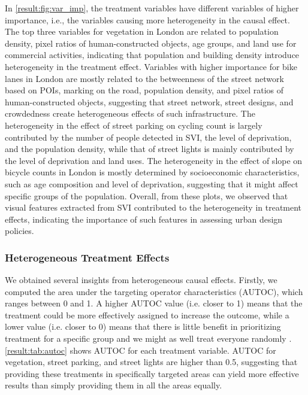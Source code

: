 \documentclass[preprint,12pt, authoryear]{elsarticle}
\begin{document}
In \autoref{result:fig:var_imp}, the treatment variables have different variables of higher importance, i.e., the variables causing more heterogeneity in the causal effect. 
The top three variables for vegetation in London are related to population density, pixel ratios of human-constructed objects, age groups, and land use for commercial activities, indicating that population and building density introduce heterogeneity in the treatment effect.
Variables with higher importance for bike lanes in London are mostly related to the betweenness of the street network based on POIs, marking on the road, population density, and pixel ratios of human-constructed objects, suggesting that street network, street designs, and crowdedness create heterogeneous effects of such infrastructure.
The heterogeneity in the effect of street parking on cycling count is largely contributed by the number of people detected in SVI, the level of deprivation, and the population density, while that of street lights is mainly contributed by the level of deprivation and land uses.
The heterogeneity in the effect of slope on bicycle counts in London is mostly determined by socioeconomic characteristics, such as age composition and level of deprivation, suggesting that it might affect specific groups of the population.
Overall, from these plots, we observed that visual features extracted from SVI contributed to the heterogeneity in treatment effects, indicating the importance of such features in assessing urban design policies.

\subsubsection{Heterogeneous Treatment Effects}
We obtained several insights from heterogeneous causal effects. 
Firstly, we computed the area under the targeting operator characteristics (AUTOC), which ranges between 0 and 1. A higher AUTOC value (i.e. closer to 1) means that the treatment could be more effectively assigned to increase the outcome, while a lower value (i.e. closer to 0) means that there is little benefit in prioritizing treatment for a specific group and we might as well treat everyone randomly \citep{yadlowsky_evaluating_2021}. 
\autoref{result:tab:autoc} shows AUTOC for each treatment variable. 
AUTOC for vegetation, street parking, and street lights are higher than 0.5, suggesting that providing these treatments in specifically targeted areas can yield more effective results than simply providing them in all the areas equally.
\end{document}
